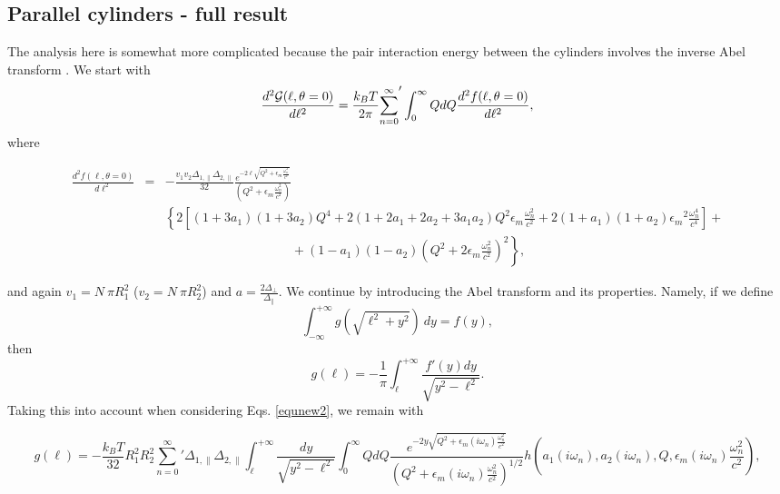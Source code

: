 \documentclass[onecolumn,letterpaper,amsmath,amssymb,floatfix,aps,superscriptaddress]{revtex4}
\begin{document}
\subsection{Parallel cylinders - full result}

The analysis here is somewhat more complicated because the pair interaction energy between the cylinders involves the inverse Abel transform \cite{Abel}. We start with
\begin{equation}
\frac{d^{2}{\cal G}(\ell,\theta = 0)}{d\ell^{2}} = \frac{k_BT}{2\pi} {\sum_{n=0}^{\infty}}' \int_0^{\infty} Q dQ \frac{d^{2}f(\ell,\theta = 0)}{d\ell^{2}},
\label{equnew1}
\end{equation}
where  
\begin{widetext}
\begin{eqnarray}
\frac{d^{2}f(\ell,\theta = 0)}{d\ell^{2}} &=& - \frac{v_1 v_2 \Delta_{1,\parallel} \Delta_{2,\parallel}}{32} 
\frac{e^{-2 \ell \sqrt{Q^{2} + \epsilon_m \frac{\omega_n^{2}}{c^{2}}}}}{(Q^{2} + \epsilon_m \frac{\omega_n^{2}}{c^{2}})} \nonumber \\
& & \left \{ 2 \left [ (1+3a_1)(1+3a_2) Q^{4} + 2 (1+2a_1+2a_2+3a_1a_2) Q^{2} \epsilon_m \frac{\omega_n^{2}}{c^{2}} + 2(1+a_1)(1+a_2) 
{\epsilon_m}^{2} \frac{\omega_n^{4}}{c^{4}}\right] \right. + \nonumber\\
& &~~~~~~~~~~~~~~~~~~~~~~~~~~~~~~~~~~~~~~~~~~~~~ +  \left. (1-a_1)(1-a_2)(Q^{2} + 2 \epsilon_m \frac{\omega_n^{2}}{c^{2}})^2 \right \},
\label{equnew2}
\end{eqnarray}
\end{widetext}
and again $v_1 = N~\pi R_1^{2}$ ($v_2 = N~\pi R_2^{2}$) and $a = \frac{2 \Delta_{\perp}}{\Delta_{\parallel}}$. We continue by introducing the Abel transform and its properties. Namely, if we define
\begin{equation}
\int_{-\infty}^{+\infty}g(\sqrt{\ell^{2}+y^{2}})~dy = f(y),
\end{equation} 
then
\begin{equation}
g(\ell) = - \frac{1}{\pi} \int_{\ell}^{+\infty} \frac{f'(y) dy}{\sqrt{y^2 - \ell^2}}.
\end{equation} 
Taking this into account when considering Eqs. \ref{equnew2}, we remain with 
\begin{widetext}
\begin{equation}
g(\ell) = - \frac{k_BT}{32} {R_1^{2} R_2^{2}} 
{\sum_{n=0}^{\infty}}' \Delta_{1,\parallel} \Delta_{2,\parallel} \int_{\ell}^{+\infty}\!\!\!\!\! \frac{dy}{\sqrt{y^2 - \ell^2}} \int_0^{\infty}\!\!\!  
Q dQ \frac{e^{-2 y \sqrt{Q^{2} + \epsilon_m(i \omega_n) \frac{\omega_n^{2}}{c^{2}}}}}{(Q^{2} + \epsilon_m(i \omega_n) \frac{\omega_n^{2}}{c^{2}})^{1/2}} 
h(a_1(i \omega_n), a_2(i \omega_n), Q, \epsilon_m(i \omega_n) \frac{\omega_n^{2}}{c^{2}}),
\end{equation} 
\end{widetext}
\end{document}
